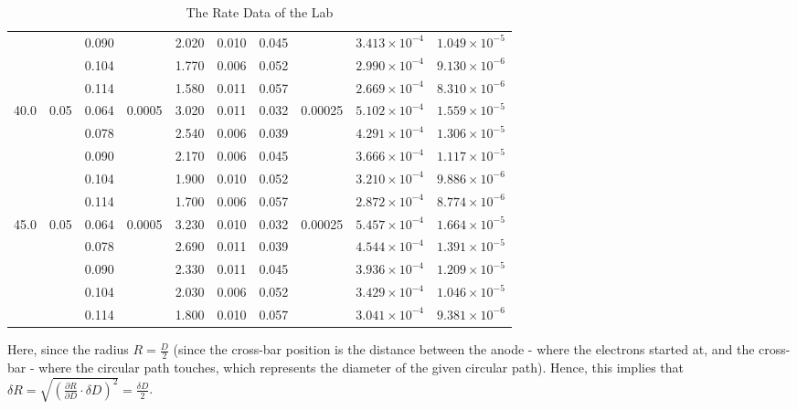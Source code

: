 \documentclass{article}
\begin{document}
\begin{table}[ht]
\begin{tabular}{cccccccccc}
     &      & 0.090 &        & 2.020 & 0.010 & 0.045 &          & $3.413\times10^{-4}$ & $1.049\times10^{-5}$ \\
     &      & 0.104 &        & 1.770 & 0.006 & 0.052 &          & $2.990\times10^{-4}$ & $9.130\times10^{-6}$ \\
     &      & 0.114 &        & 1.580 & 0.011 & 0.057 &          & $2.669\times10^{-4}$ & $8.310\times10^{-6}$ \\
\midrule
40.0 & 0.05 & 0.064 & 0.0005 & 3.020 & 0.011 & 0.032 & 0.00025 & $5.102\times10^{-4}$ & $1.559\times10^{-5}$ \\
     &      & 0.078 &        & 2.540 & 0.006 & 0.039 &          & $4.291\times10^{-4}$ & $1.306\times10^{-5}$ \\
     &      & 0.090 &        & 2.170 & 0.006 & 0.045 &          & $3.666\times10^{-4}$ & $1.117\times10^{-5}$ \\
     &      & 0.104 &        & 1.900 & 0.010 & 0.052 &          & $3.210\times10^{-4}$ & $9.886\times10^{-6}$ \\
     &      & 0.114 &        & 1.700 & 0.006 & 0.057 &          & $2.872\times10^{-4}$ & $8.774\times10^{-6}$ \\
\midrule
45.0 & 0.05 & 0.064 & 0.0005 & 3.230 & 0.010 & 0.032 & 0.00025 & $5.457\times10^{-4}$ & $1.664\times10^{-5}$ \\
     &      & 0.078 &        & 2.690 & 0.011 & 0.039 &          & $4.544\times10^{-4}$ & $1.391\times10^{-5}$ \\
     &      & 0.090 &        & 2.330 & 0.011 & 0.045 &          & $3.936\times10^{-4}$ & $1.209\times10^{-5}$ \\
     &      & 0.104 &        & 2.030 & 0.006 & 0.052 &          & $3.429\times10^{-4}$ & $1.046\times10^{-5}$ \\
     &      & 0.114 &        & 1.800 & 0.010 & 0.057 &          & $3.041\times10^{-4}$ & $9.381\times10^{-6}$ \\
\bottomrule
\end{tabular}
\caption{The Rate Data of the Lab}
\end{table}

Here, since the radius $R = \frac{D}{2}$ (since the cross-bar position is the distance between the anode - where the electrons started at, and the cross-bar - where the circular path touches, which represents the diameter of the given circular path). Hence, this implies that $\delta R = \sqrt{\left(\frac{\partial R}{\partial D}\cdot \delta D\right)^2} = \frac{\delta D}{2}$.
\end{document}
